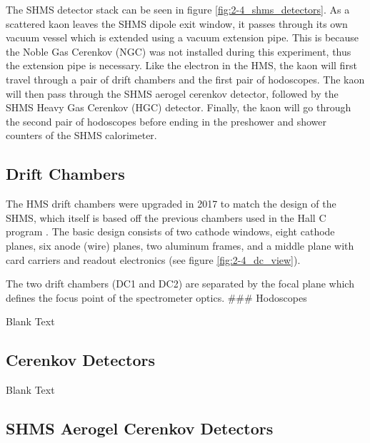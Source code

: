 \documentclass[
]{report}
\begin{document}


The SHMS detector stack can be seen in figure
\ref{fig:2-4_shms_detectors}. As a scattered kaon leaves the SHMS dipole
exit window, it passes through its own vacuum vessel which is extended
using a vacuum extension pipe. This is because the Noble Gas Cerenkov
(NGC) was not installed during this experiment, thus the extension pipe
is necessary. Like the electron in the HMS, the kaon will first travel
through a pair of drift chambers and the first pair of hodoscopes. The
kaon will then pass through the SHMS aerogel cerenkov detector, followed
by the SHMS Heavy Gas Cerenkov (HGC) detector. Finally, the kaon will go
through the second pair of hodoscopes before ending in the preshower and
shower counters of the SHMS calorimeter.

\hypertarget{drift-chambers}{%
\subsection{Drift Chambers}\label{drift-chambers}}

The HMS drift chambers were upgraded in 2017 to match the design of the
SHMS, which itself is based off the previous chambers used in the Hall C
program \cite{pandey_status_2017} \cite{tang_hall_2017}
\cite{christy_hall_2016}. The basic design consists of two cathode
windows, eight cathode planes, six anode (wire) planes, two aluminum
frames, and a middle plane with card carriers and readout electronics
(see figure \ref{fig:2-4_dc_view}).



The two drift chambers (DC1 and DC2) are separated by the focal plane
which defines the focus point of the spectrometer optics. \#\#\#
Hodoscopes

Blank Text

\hypertarget{cerenkov-detectors}{%
\subsection{Cerenkov Detectors}\label{cerenkov-detectors}}

Blank Text

\hypertarget{shms-aerogel-cerenkov-detectors}{%
\subsection{SHMS Aerogel Cerenkov
Detectors}\label{shms-aerogel-cerenkov-detectors}}
\end{document}
